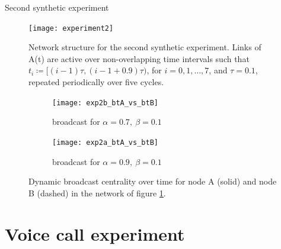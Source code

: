 \newpage
Second synthetic experiment

\begin{figure}[h]\centering
    \texttt{[image: experiment2]}
    \caption{Network structure for the second synthetic experiment. Links of A(t) are active over non-overlapping time intervals such that $t_i\coloneqq[(i − 1)\tau , (i − 1 + 0.9)\tau )$, for $i=0, 1, \dots , 7$, and $\tau =0.1$, repeated periodically over five cycles.}
    \label{fig:exp2}
    \bigskip
\end{figure}

\begin{figure}
     \centering
     \begin{subfigure}[b]{0.49\textwidth}
         \centering
         \texttt{[image: exp2b\_btA\_vs\_btB]}
         \caption{broadcast for $\alpha = 0.7 ,~\beta = 0.1$}
         \label{fig:bt5}
     \end{subfigure}
     \hfill
     \begin{subfigure}[b]{0.49\textwidth}
         \centering
         \texttt{[image: exp2a\_btA\_vs\_btB]}
         \caption{broadcast for $\alpha = 0.9 ,~\beta = 0.1$}
         \label{fig:bt6}
     \end{subfigure}
     \caption{Dynamic broadcast centrality over time for node A (solid) and node B (dashed) in the network of figure \ref{fig:exp2}.}
     \label{fig:twobt}
\end{figure}

\newpage
\section{Voice call experiment}
\label{sec:voicecall}

